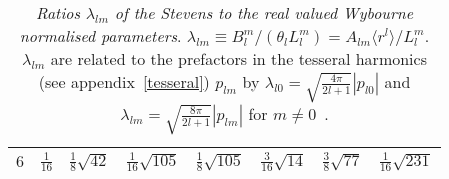 \begin{table}[h]
\begin{center}
\begin{tabular}{c|ccccccc}
      $6$ & $\frac{1}{16}$ & $\frac{1}{8}\sqrt{42}$ & $\frac{1}{16}\sqrt{105}$ & $\frac{1}{8}\sqrt{105}$ & $\frac{3}{16}\sqrt{14}$ &
            $\frac{3}{8}\sqrt{77}$ & $\frac{1}{16}\sqrt{231}$ \\
      \hline
    \end{tabular}
    \caption{\emph{Ratios $\lambda_{lm}$ of the Stevens to the real valued
 Wybourne normalised parameters}.
$\lambda_{lm} \equiv B_l^m/(\theta_lL_l^m)= A_{lm}\langle r^l \rangle / L_l^m$. 
$ \lambda_{lm}$ are related to the prefactors in the 
tesseral harmonics (see appendix~\ref{tesseral}) $p_{lm}$ by 
$\lambda_{l0} =\sqrt{\frac{4\pi}{2l+1}}|p_{l0}|$ and
$\lambda_{lm} =\sqrt{\frac{8\pi}{2l+1}}|p_{lm}|$ for $m \neq 0$~\cite[note that Newman on p.30, equ (2.7) defines
his real valued Wybourne 
parameters $B_m^l({\rm Newman})\equiv (-1)^m L_l^m$]{newman00-1}.} \label{tab:wytostev}
  \end{center}
\end{table}
\clearpage
